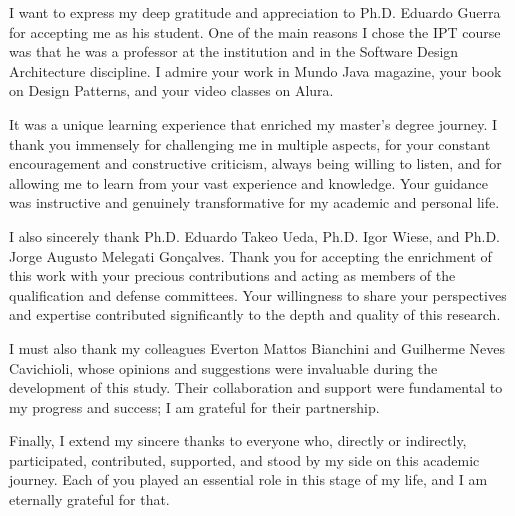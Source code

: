 \begin{acknowledgments}
 I want to express my deep gratitude and appreciation to Ph.D. Eduardo Guerra for accepting me as his student. One of the main reasons I chose the IPT course was that he was a professor at the institution and in the Software Design Architecture discipline. I admire your work in Mundo Java magazine, your book on Design Patterns, and your video classes on Alura.

It was a unique learning experience that enriched my master's degree journey. I thank you immensely for challenging me in multiple aspects, for your constant encouragement and constructive criticism, always being willing to listen, and for allowing me to learn from your vast experience and knowledge. Your guidance was instructive and genuinely transformative for my academic and personal life.

I also sincerely thank Ph.D. Eduardo Takeo Ueda, Ph.D. Igor Wiese, and Ph.D. Jorge Augusto Melegati Gonçalves. Thank you for accepting the enrichment of this work with your precious contributions and acting as members of the qualification and defense committees. Your willingness to share your perspectives and expertise contributed significantly to the depth and quality of this research.

I must also thank my colleagues Everton Mattos Bianchini and Guilherme Neves Cavichioli, whose opinions and suggestions were invaluable during the development of this study. Their collaboration and support were fundamental to my progress and success; I am grateful for their partnership.

Finally, I extend my sincere thanks to everyone who, directly or indirectly, participated, contributed, supported, and stood by my side on this academic journey. Each of you played an essential role in this stage of my life, and I am eternally grateful for that.
\end{acknowledgments}
